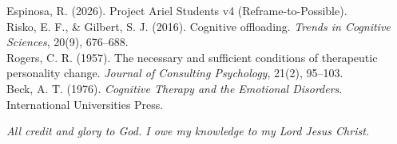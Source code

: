 \documentclass[11pt, a4paper]{article}
\begin{document}
\noindent [12] Espinosa, R. (2026). Project Ariel Students v4 (Reframe-to-Possible).\\
\noindent [13] Risko, E. F., \& Gilbert, S. J. (2016). Cognitive offloading. \textit{Trends in Cognitive Sciences}, 20(9), 676--688.\\
\noindent [14] Rogers, C. R. (1957). The necessary and sufficient conditions of therapeutic personality change. \textit{Journal of Consulting Psychology}, 21(2), 95--103.\\
\noindent [15] Beck, A. T. (1976). \textit{Cognitive Therapy and the Emotional Disorders}. International Universities Press.

\vspace{1.1em}
\noindent\textit{All credit and glory to God. I owe my knowledge to my Lord Jesus Christ.}
\end{document}
